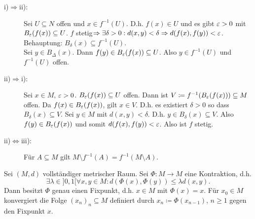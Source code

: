 \begin{beweis}
	\begin{description}
		\item[i)$ \Rightarrow $ii):] Sei $ U\subseteq N $ offen und $ x\in f^{-1}(U) $. D.h. $ f(x)\in U $ und es gibt $ \varepsilon>0 $ mit $ B_\varepsilon(f(x))\subseteq U $. $ f $ stetig$ \Rightarrow\exists\delta>0: d(x,y)<\delta\Rightarrow d(f(x),f(y))<\varepsilon $.\\
		Behauptung: $ B_\delta(x)\subseteq f^{-1}(U) $.\\
		Sei $ y\in B_\Delta(x) $. Dann $ f(y)\in B_\varepsilon(f(x))\subseteq U $. Also $ y\in f^{-1}(U) $ und $ f^{-1}(U) $ offen.
		\item[ii)$ \Rightarrow $i):] Sei $ x\in M $, $ \varepsilon>0 $. $ B_\varepsilon(f(x))\subseteq U $ offen. Dann ist $ V\coloneqq f^{-1}(B_\varepsilon(f(x)))\subseteq M $ offen. Da $ f(x)\in B_\varepsilon(f(x)) $, gilt $ x\in V $. D.h. es existiert $ \delta>0 $ so dass $ B_\delta(x)\subseteq V $. Sei $ y\in M $ mit $ d(x,y)<\delta $. D.h. $ y\in B_\delta(x)\subseteq V $. Also $ f(y)\in B_\varepsilon(f(x)) $ und somit $ d(f(x),f(y))<\varepsilon $. Also ist $ f $ stetig.
		\item[ii)$ \Leftrightarrow $iii):] F\"ur $ A\subseteq M $ gilt $ M\setminus f^{-1}(A)=f^{-1}(M\setminus A) $.   
	\end{description}
\end{beweis}
\begin{satz}
	Sei $ (M,d) $ vollst\"andiger metrischer Raum. Sei $ \Phi\colon M\rightarrow M $ eine Kontraktion, d.h.
	\[ \exists\lambda\in]0,1[\forall x,y\in M: d(\Phi(x),\Phi(y))\leq\lambda d(x,y). \]
	Dann besitzt $ \Phi $ genau einen Fixpunkt, d.h. $ x\in M $ mit $ \Phi(x)=x $. F\"ur $ x_0\in M $ konvergiert die Folge $ (x_n)_n\subseteq M $ definiert durch $ x_n\coloneqq\Phi(x_{n-1}) $, $ n\geq 1 $ gegen den Fixpunkt $ x $.
\end{satz}
